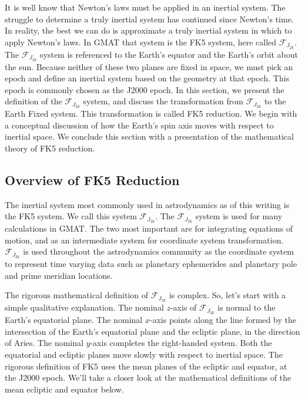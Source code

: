It is well know that Newton's laws must be applied in an inertial
system.  The struggle to determine a truly inertial system has
continued since Newton's time.  In reality, the best we can do is
approximate a truly inertial system  in which to apply Newton's
laws. In GMAT that system is the FK5 system, here called
$\mathcal{F}_{J_{2k}}$.  The $\mathcal{F}_{J_{2k}}$ system is
referenced to the Earth's equator and the Earth's orbit about the
sun.  Because neither of these two planes are fixed in space, we
must pick an epoch and define an inertial system based on the
geometry at that epoch.  This epoch is commonly chosen as the J2000
epoch.  In this section, we present the definition of the
$\mathcal{F}_{J_{2k}}$ system, and discuss the transformation from
$\mathcal{F}_{J_{2k}}$  to the Earth Fixed system.  This
transformation is called FK5 reduction.  We begin with a conceptual
discussion of how the Earth's spin axis moves with respect to
inertial space.  We conclude this section with a presentation of the
mathematical theory of FK5 reduction.



\subsection{Overview of FK5 Reduction} 

The inertial system most commonly used in astrodynamics as of this
writing is the FK5 system.  We call this system
$\mathcal{F}_{J_{2k}}$.  The $\mathcal{F}_{J_{2k}}$ system is used
for many calculations in GMAT.  The two most important are for
integrating equations of motion, and as an intermediate system for
coordinate system transformation. $\mathcal{F}_{J_{2k}}$ is used
throughout the astrodynamics community as the coordinate system to
represent time varying data such as planetary ephemerides and
planetary pole and prime meridian locations.

The rigorous mathematical definition of $\mathcal{F}_{J_{2k}}$ is
complex. So, let's start with a simple qualitative explanation.
The nominal $z$-axis of $\mathcal{F}_{J_{2k}}$ is normal to the
Earth's equatorial plane.  The nominal $x$-axis points along the
line formed by the intersection of the Earth's equatorial plane
and the ecliptic plane, in the direction of Aries.  The nominal
$y$-axis completes the right-handed system. Both the equatorial
and ecliptic planes move slowly with respect to inertial space.
The rigorous definition of FK5 uses the mean planes of the
ecliptic and equator, at the J2000 epoch. We'll take a closer look
at the mathematical definitions of the mean ecliptic and equator
below.


